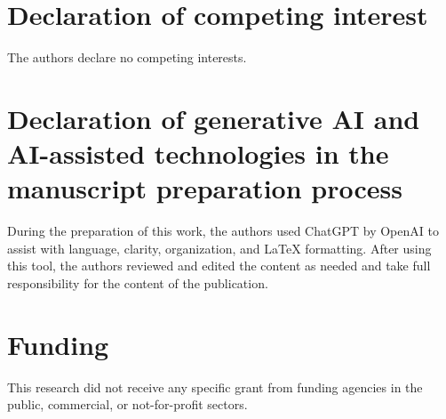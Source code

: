 \documentclass[a4paper,fleqn]{cas-dc}
\theoremstyle{definition}
\theoremstyle{remark}
\newcommand{\0}{\mathbf{0}}
\begin{document}
\section*{Declaration of competing interest}
The authors declare no competing interests.

\section*{Declaration of generative AI and AI-assisted technologies in the manuscript preparation process}
During the preparation of this work, the authors used ChatGPT by OpenAI to
assist with language, clarity, organization, and LaTeX formatting. After
using this tool, the authors reviewed and edited the content as needed and
take full responsibility for the content of the publication.

\section*{Funding}
This research did not receive any specific grant from funding agencies in the public, commercial, or not-for-profit sectors.



\end{document}
